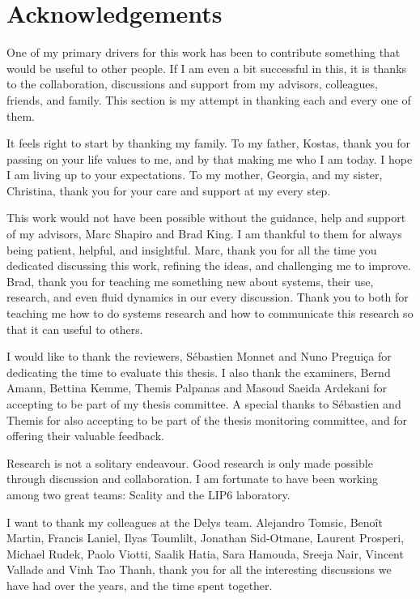 \chapter*{Acknowledgements}

One of my primary drivers for this work has been to contribute something that would be useful to other people.
If I am even a bit successful in this, it is thanks to the collaboration, discussions and support from my
advisors, colleagues, friends, and family.
This section is my attempt in thanking each and every one of them.

\small
It feels right to start by thanking my family. To my father, Kostas, thank you for passing on your life values to me,
and by that making me who I am today. I hope I am living up to your expectations.
To my mother, Georgia, and my sister, Christina, thank you for your care and support at my every step.

\bigskip
This work would not have been possible without the guidance, help and support of my advisors, Marc Shapiro and Brad King.
I am thankful to them for always being patient, helpful, and insightful.
Marc, thank you for all the time you dedicated discussing this work,
refining the ideas, and challenging me to improve.
Brad, thank you for teaching me something new about systems, their use, research, and even fluid dynamics in our every
discussion.
Thank you to both for teaching me how to do systems research and how to communicate this research so that it can useful
to others.

\bigskip
I would like to thank the reviewers, S{\'e}bastien Monnet and Nuno Pregui\c{c}a for dedicating the time
to evaluate this thesis.
I also thank the examiners, Bernd Amann, Bettina Kemme, Themis Palpanas and Masoud Saeida Ardekani for accepting to be
part of my thesis committee.
A special thanks to S{\'e}bastien and Themis for also accepting to be part of the thesis monitoring committee,
and for offering their valuable feedback.

\bigskip
Research is not a solitary endeavour.
Good research is only made possible through discussion and collaboration.
I am fortunate to have been working among two great teams: Scality and the LIP6 laboratory.

I want to thank my colleagues at the Delys team.
Alejandro Tomsic, Beno\^it Martin, Francis Laniel, Ilyas Toumlilt, Jonathan Sid-Otmane, Laurent Prosperi, Michael Rudek, Paolo Viotti, Saalik Hatia, Sara Hamouda, Sreeja Nair, Vincent Vallade and Vinh Tao Thanh, thank you
for all the interesting discussions we have had over the years, and the time spent together.

